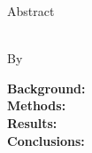 
\begin{singlespace}
    \begin{center}
        Abstract 
        
        \bigskip
        
        \mytitle \\
        By \myname
    
    \end{center}

    \bigskip
    
    \noindent\textbf{Background:} %
    \lipsum[1] \\


    \noindent\textbf{Methods:} %
    \lipsum[2] \\


    \noindent\textbf{Results:} %
    \lipsum[3] \\


    \noindent\textbf{Conclusions:} %
    \lipsum[4]
    
    
\end{singlespace}
\newpage
